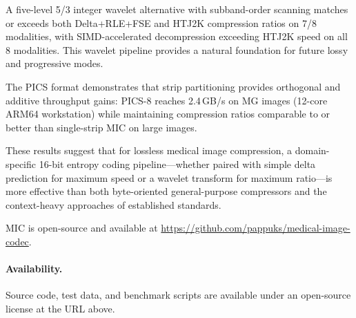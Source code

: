 \documentclass[11pt,twocolumn]{article}
\begin{document}
A five-level 5/3 integer wavelet alternative with subband-order scanning matches or exceeds both Delta+RLE+FSE and HTJ2K compression ratios on 7/8 modalities, with SIMD-accelerated decompression exceeding HTJ2K speed on all 8 modalities.
This wavelet pipeline provides a natural foundation for future lossy and progressive modes.

The PICS format demonstrates that strip partitioning provides orthogonal and additive throughput gains: PICS-8 reaches 2.4\,GB/s on MG images (12-core ARM64 workstation) while maintaining compression ratios comparable to or better than single-strip MIC on large images.

These results suggest that for lossless medical image compression, a domain-specific 16-bit entropy coding pipeline---whether paired with simple delta prediction for maximum speed or a wavelet transform for maximum ratio---is more effective than both byte-oriented general-purpose compressors and the context-heavy approaches of established standards.

MIC is open-source and available at \url{https://github.com/pappuks/medical-image-codec}.

\paragraph{Availability.}
Source code, test data, and benchmark scripts are available under an open-source license at the URL above.
\end{document}
